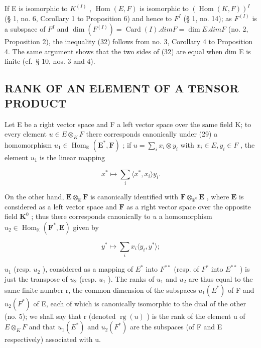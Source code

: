 If E is isomorphic to \(K^{(I)}\) , \(\operatorname{Hom}(E, F)\) is isomorphic to \((\operatorname{Hom}(K, F))^{I}\) (§ 1, no. 6, Corollary 1 to Proposition 6) and hence to \(F^{I}\) (§ 1, no. 14); as \(F^{(I)}\) is a subspace of \(F^{I}\) and \(\dim(F^{(I)}) = \operatorname{Card}(I).dim F = \dim E. dim F\) (no. 2, Proposition 2), the inequality (32) follows from no. 3, Corollary 4 to Proposition 4. The same argument shows that the two sides of (32) are equal when dim E is finite (cf.~§ 10, nos. 3 and 4).

\subsection{RANK OF AN ELEMENT OF A TENSOR PRODUCT}

Let E be a right vector space and F a left vector space over the same field K; to every element \(u \in E \otimes_{K} F\) there corresponds canonically under (29) a homomorphism \(u_{1} \in \operatorname{Hom}_{\mathbb{K}}(\mathbf{E}^{*}, \mathbf{F})\) ; if \(u = \sum_{i} x_{i} \otimes y_{i}\) with \(x_{i} \in E, y_{i} \in F\) , the element \(u_{1}\) is the linear mapping

\[
x ^ {*} \mapsto \sum_ {i} \langle x ^ {*}, x _ {i} \rangle y _ {i}.\tag{33}
\]

On the other hand, \(\mathbf{E} \otimes_{\mathbb{K}} \mathbf{F}\) is canonically identified with \(\mathbf{F} \otimes_{\mathbb{K}^0} \mathbf{E}\) , where \(\mathbf{E}\) is considered as a left vector space and \(\mathbf{F}\) as a right vector space over the opposite field \(\mathbf{K}^0\) ; thus there corresponds canonically to \(u\) a homomorphism \(u_2 \in \operatorname{Hom}_{\mathbb{K}}(\mathbf{F}^*, \mathbf{E})\) given by

\[
y ^ {*} \mapsto \sum_ {i} x _ {i} \langle y _ {i}, y ^ {*} \rangle ;\tag{34}
\]

\(u_{1}\) (resp. \(u_{2}\) ), considered as a mapping of \(E^{*}\) into \(F^{**}\) (resp. of \(F^{*}\) into \(E^{**}\) ) is just the transpose of \(u_{2}\) (resp. \(u_{1}\) ). The ranks of \(u_{1}\) and \(u_{2}\) are thus equal to the same finite number r, the common dimension of the subspaces \(u_{1}(E^{*})\) of F and \(u_{2}(F^{*})\) of E, each of which is canonically isomorphic to the dual of the other (no. 5); we shall say that r (denoted \(\operatorname{rg}(u)\) ) is the rank of the element u of \(E \otimes_{K} F\) and that \(u_{1}(E^{*})\) and \(u_{2}(F^{*})\) are the subspaces (of F and E respectively) associated with u.

